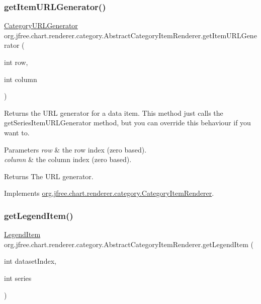 \subsubsection{\texorpdfstring{get\+Item\+U\+R\+L\+Generator()}{getItemURLGenerator()}}
{\footnotesize\ttfamily \mbox{\hyperlink{interfaceorg_1_1jfree_1_1chart_1_1urls_1_1_category_u_r_l_generator}{Category\+U\+R\+L\+Generator}} org.\+jfree.\+chart.\+renderer.\+category.\+Abstract\+Category\+Item\+Renderer.\+get\+Item\+U\+R\+L\+Generator (\begin{DoxyParamCaption}\item[{int}]{row,  }\item[{int}]{column }\end{DoxyParamCaption})}

Returns the U\+RL generator for a data item. This method just calls the get\+Series\+Item\+U\+R\+L\+Generator method, but you can override this behaviour if you want to.


\begin{DoxyParams}{Parameters}
{\em row} & the row index (zero based). \\
\hline
{\em column} & the column index (zero based).\\
\hline
\end{DoxyParams}
\begin{DoxyReturn}{Returns}
The U\+RL generator. 
\end{DoxyReturn}


Implements \mbox{\hyperlink{interfaceorg_1_1jfree_1_1chart_1_1renderer_1_1category_1_1_category_item_renderer_aeceb294cd4902cc86e674688c3e28897}{org.\+jfree.\+chart.\+renderer.\+category.\+Category\+Item\+Renderer}}.

\mbox{\label{classorg_1_1jfree_1_1chart_1_1renderer_1_1category_1_1_abstract_category_item_renderer_a7a86e8d71b7d79ed228580497ac39dca}} 
\subsubsection{\texorpdfstring{get\+Legend\+Item()}{getLegendItem()}}
{\footnotesize\ttfamily \mbox{\hyperlink{classorg_1_1jfree_1_1chart_1_1_legend_item}{Legend\+Item}} org.\+jfree.\+chart.\+renderer.\+category.\+Abstract\+Category\+Item\+Renderer.\+get\+Legend\+Item (\begin{DoxyParamCaption}\item[{int}]{dataset\+Index,  }\item[{int}]{series }\end{DoxyParamCaption})}

